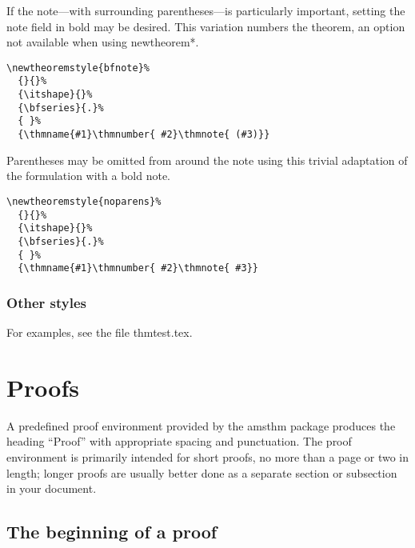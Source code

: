 \documentclass[11pt,twoside]{article}
\providecommand{\qq}[1]{\textquotedblleft#1\textquotedblright}
\newcommand{\ntt}{%
  \fontfamily\ttdefault \fontseries\mddefault \fontshape\updefault
  \selectfont
}
\DeclareRobustCommand{\cn}[1]{{\ntt\bslchar#1}}
\DeclareRobustCommand{\pkg}[1]{{\ntt#1}}
\DeclareRobustCommand{\env}[1]{{\ntt#1}}
\DeclareRobustCommand{\fn}[1]{{\ntt#1}}
\begin{document}
If the note---with surrounding parentheses---is particularly important,
setting the note field in bold may be desired.  This variation numbers
the theorem, an option not available when using \cn{newtheorem*}.
\begin{verbatim}
\newtheoremstyle{bfnote}%
  {}{}%
  {\itshape}{}%
  {\bfseries}{.}%
  { }%
  {\thmname{#1}\thmnumber{ #2}\thmnote{ (#3)}}
\end{verbatim}

Parentheses may be omitted from around the note using this trivial
adaptation of the formulation with a bold note.
\begin{verbatim}
\newtheoremstyle{noparens}%
  {}{}%
  {\itshape}{}%
  {\bfseries}{.}%
  { }%
  {\thmname{#1}\thmnumber{ #2}\thmnote{ #3}}
\end{verbatim}

%

\subsubsection{Other styles}
For examples, see the file \fn{thmtest.tex}.


\newpage %

\section{Proofs}

A predefined \env{proof} environment provided by the \pkg{amsthm}
package produces the heading \qq{Proof} with appropriate spacing and
punctuation. The proof environment is primarily intended for short
proofs, no more than a page or two in length; longer proofs are
usually better done as a separate \cn{section} or \cn{subsection} in
your document.

\subsection{The beginning of a proof}
\end{document}

